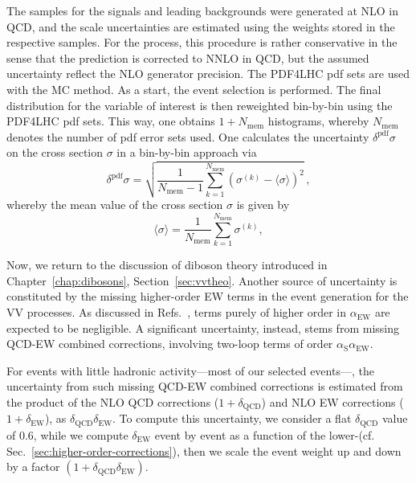 The samples for the signals and leading backgrounds were generated at NLO in QCD,
and the scale uncertainties are estimated using the weights
stored in the respective samples. For the \ZZ process, this procedure is rather conservative
in the sense that the prediction is corrected to NNLO in QCD, but the assumed uncertainty reflect
the NLO generator precision.
The PDF4LHC pdf sets are used with the MC method. As a start, the
event selection is performed. The final distribution for the variable
of interest is then reweighted bin-by-bin using the PDF4LHC pdf
sets. This way, one obtains $1+N_{\textrm{mem}}$ histograms, whereby
$N_{\textrm{mem}}$ denotes the number of pdf error sets used. One
calculates the uncertainty $\delta^{\textrm{pdf}}\sigma$ on the cross
section $\sigma$ in a bin-by-bin approach via 
\begin{equation}
\delta^{\textrm{pdf}} \sigma= \sqrt{ \frac{1}{N_{\textrm{mem}} - 1} \sum_{k=1}^{N_{\textrm{mem}}} \left(\sigma^{(k)} - \langle \sigma \rangle\right)^2 }\,,
\end{equation}
whereby the mean value of the cross section $\sigma$ is given by
\begin{equation}
\langle\sigma\rangle = \frac{1}{N_{\textrm{mem}}} \sum_{k=1}^{N_{\textrm{mem}}} \sigma^{(k)},
\end{equation}

Now, we return to the discussion of diboson theory introduced in Chapter~\ref{chap:dibosons}, Section~\ref{sec:vvtheo}.
Another source of uncertainty is constituted by the missing
higher-order EW terms in the event generation for the VV processes.
As discussed in Refs.~\cite{Bierweiler:2013dja,Gieseke:2014gka}, terms purely of higher
order in $\alpha_{\mathrm{EW}}$ are expected to be negligible.
A significant uncertainty, instead, stems from missing
QCD-EW combined corrections, \eg involving two-loop terms of order
$\alpha_{\mathrm{S}}\alpha_{\mathrm{EW}}$.

For \ZZ events with little hadronic activity---\ie most of our selected events---, the
uncertainty from such missing QCD-EW combined corrections is
estimated from the product of the NLO QCD corrections 
($1+\delta_{\mathrm{QCD}}$) and NLO EW corrections
($1+\delta_{\mathrm{EW}}$), as
$\delta_{\mathrm{QCD}}\delta_{\mathrm{EW}}$. To compute this 
uncertainty, we consider a flat $\delta_{\mathrm{QCD}}$ value of
$0.6$, while we compute $\delta_{\mathrm{EW}}$ event by event as a
function of the lower-\Z \pt (cf. Sec.~\ref{sec:higher-order-corrections}), then we
scale the event weight up and down by a factor
$(1+\delta_{\mathrm{QCD}}\delta_{\mathrm{EW}})$.

